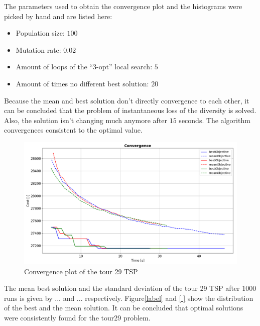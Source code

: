 \documentclass[a4paper,10pt]{article}
\begin{document}
The parameters used to obtain the convergence plot and the histograms were picked by hand and are listed here:
\begin{itemize}
	\item Population size: $ 100 $
	\item Mutation rate: $ 0.02 $
	\item Amount of loops of the ``3-opt'' local search: $ 5 $
	\item Amount of times no different best solution: $ 20 $ 
\end{itemize}
  
Because the mean and best solution don't directly convergence to each other, it can be concluded that the problem of instantaneous loss of the diversity is solved. Also, the solution isn't changing much anymore after $ 15 $ seconds. The algorithm convergences consistent to the optimal value. 


\begin{figure}[h]
	\label{fig:convergence_tour29}
	\includegraphics[width=1\textwidth]{Convergence_tour29.PNG}
	\caption{Convergence plot of the tour 29 TSP}
	\centering
\end{figure}

The mean best solution and the standard deviation of the tour 29 TSP after $ 1000 $ runs is given by ...  and ... respectively. Figure\ref{label} and \ref{ } show the distribution of the best and the mean solution. It can be concluded that optimal solutions were consistently found for the tour29 problem.  

\end{document}
